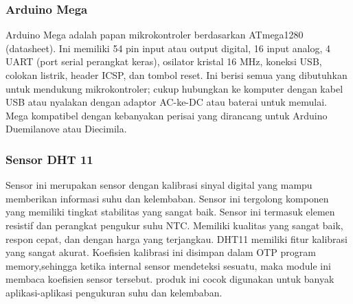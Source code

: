 \subsubsection{Arduino Mega}

Arduino Mega adalah papan mikrokontroler berdasarkan ATmega1280 (datasheet). Ini memiliki 54 pin input atau output digital, 16 input analog, 4 UART (port serial perangkat keras), osilator kristal 16 MHz, koneksi USB, colokan listrik, header ICSP, dan tombol reset. Ini berisi semua yang dibutuhkan untuk mendukung mikrokontroler; cukup hubungkan ke komputer dengan kabel USB atau nyalakan dengan adaptor AC-ke-DC atau baterai untuk memulai. Mega kompatibel dengan kebanyakan perisai yang dirancang untuk Arduino Duemilanove atau Diecimila.

\subsubsection{Sensor DHT 11}
Sensor ini merupakan sensor dengan kalibrasi sinyal digital yang mampu memberikan informasi suhu dan kelembaban. Sensor ini tergolong komponen yang memiliki tingkat stabilitas yang sangat baik. Sensor ini termasuk elemen resistif dan perangkat pengukur suhu NTC.
Memiliki kualitas yang sangat baik, respon cepat, dan dengan harga yang
terjangkau. DHT11 memiliki fitur kalibrasi yang sangat akurat. Koefisien kalibrasi ini disimpan dalam OTP program memory,sehingga ketika internal sensor mendeteksi sesuatu, maka module ini membaca koefisien sensor tersebut. produk ini cocok digunakan untuk banyak aplikasi-aplikasi pengukuran suhu dan kelembaban.
